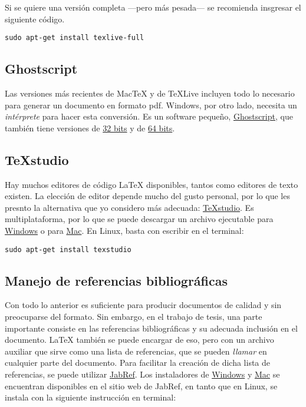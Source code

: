 \documentclass[letterpaper,12pt]{article}
\begin{document}
Si se quiere una versión completa ---pero más pesada--- se recomienda insgresar el siguiente código.

\begin{verbatim}
sudo apt-get install texlive-full
\end{verbatim}

\subsection*{Ghostscript}
Las versiones más recientes de MacTeX y de TeXLive incluyen todo lo necesario para generar un documento en formato pdf. Windows, por otro lado, necesita un \emph{intérprete} para hacer esta conversión. Es un software pequeño, \href{http://www.ghostscript.com/}{Ghostscript}, que también tiene versiones de \href{https://github.com/ArtifexSoftware/ghostpdl-downloads/releases/download/gs921/gs921w32.exe}{32 bits} y de \href{https://github.com/ArtifexSoftware/ghostpdl-downloads/releases/download/gs921/gs921w64.exe}{64 bits}.

\subsection*{TeXstudio}
Hay muchos editores de código \LaTeX{} disponibles, tantos como editores de texto existen. La elección de editor depende mucho del gusto personal, por lo que les presnto la alternativa que yo considero más adecuada: \href{http://www.texstudio.org/}{TeXstudio}. Es multiplataforma, por lo que se puede descargar un archivo ejecutable para \href{https://sourceforge.net/projects/texstudio/files/texstudio/TeXstudio\%202.12.6/texstudio-2.12.6-win-qt5.9.1.exe/download}{Windows} o para \href{http://sourceforge.net/projects/texstudio/files/texstudio/TeXstudio\%202.9.4/texstudio_2.9.4_osx_qt5.zip/download}{Mac}. En Linux, basta con escribir en el terminal:

\begin{verbatim}
sudo apt-get install texstudio
\end{verbatim}


\subsection*{Manejo de referencias bibliográficas}

Con todo lo anterior es suficiente para producir documentos de calidad y sin preocuparse del formato. Sin embargo, en el trabajo de tesis, una parte importante consiste en las referencias bibliográficas y su adecuada inclusión en el documento. \LaTeX{} también se puede encargar de eso, pero con un archivo auxiliar que sirve como una lista de referencias, que se pueden \emph{llamar} en cualquier parte del documento. Para facilitar la creación de dicha lista de referencias, se puede utilizar \href{http://jabref.sourceforge.net/}{JabRef}. Los instaladores de \href{http://sourceforge.net/projects/jabref/files/jabref/2.10/JabRef-2.10-setup.exe/download}{Windows} y \href{http://sourceforge.net/projects/jabref/files/jabref/2.10/JabRef-2.10-OSX.zip/download}{Mac} se encuentran disponibles en el sitio web de JabRef, en tanto que en Linux, se instala con la siguiente instrucción en terminal:
\end{document}
